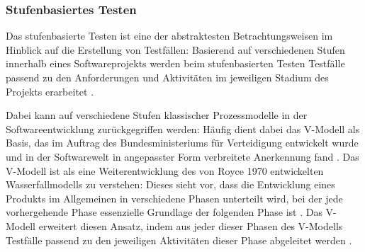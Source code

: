 \subsubsection{Stufenbasiertes Testen}\label{subsec:stufen}

Das stufenbasierte Testen ist eine der abstraktesten Betrachtungsweisen im Hinblick auf die Erstellung von Testfällen: Basierend auf verschiedenen Stufen innerhalb eines Softwareprojekts werden beim stufenbasierten Testen Testfälle passend zu den Anforderungen und Aktivitäten im jeweiligen Stadium des Projekts erarbeitet \cite[S. 5]{ammann2008introduction}. 

Dabei kann auf verschiedene Stufen klassischer Prozessmodelle in der Softwareentwicklung zurückgegriffen werden: Häufig dient dabei das V-Modell als Basis, das im Auftrag des Bundesministeriums für Verteidigung entwickelt wurde und in der Softwarewelt in angepasster Form verbreitete Anerkennung fand \cite[S. 190]{ludewig2010software}. Das V-Modell ist als eine Weiterentwicklung des von Royce \cite{royce1987managing} 1970 entwickelten Wasserfallmodells zu verstehen: Dieses sieht vor, dass die Entwicklung eines Produkts im Allgemeinen in verschiedene Phasen unterteilt wird, bei der jede vorhergehende Phase essenzielle Grundlage der folgenden Phase ist \cite[S. 57 f.]{sommerville2012software-engineering}. Das V-Modell erweitert diesen Ansatz, indem aus jeder dieser Phasen des V-Modells Testfälle passend zu den jeweiligen Aktivitäten dieser Phase abgeleitet werden \cite[S. 190]{ludewig2010software}. %


